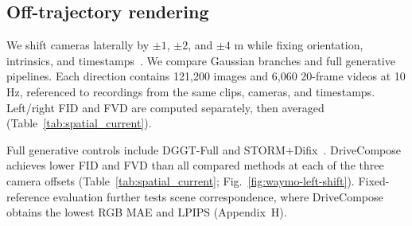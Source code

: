\subsection{Off-trajectory rendering}
\label{sec:spatial_evaluation}
We shift cameras laterally by $\pm1$, $\pm2$, and $\pm4$ m while fixing orientation, intrinsics, and timestamps~\cite{chi2026pointforward,zhu2025worldsplat}. We compare Gaussian branches and full generative pipelines. Each direction contains 121,200 images and 6,060 20-frame videos at 10 Hz, referenced to recordings from the same clips, cameras, and timestamps. Left/right FID and FVD are computed separately, then averaged (Table~\ref{tab:spatial_current}).

Full generative controls include DGGT-Full and STORM+Difix~\cite{wu2025difix3d}. DriveCompose achieves lower FID and FVD than all compared methods at each of the three camera offsets (Table~\ref{tab:spatial_current}; Fig.~\ref{fig:waymo-left-shift}). Fixed-reference evaluation further tests scene correspondence, where DriveCompose obtains the lowest RGB MAE and LPIPS (Appendix~H).

\begin{table}[!htbp]
\centering
\footnotesize
\setlength{\tabcolsep}{2.5pt}
\renewcommand{\arraystretch}{1.08}
\caption{\textbf{Off-trajectory distribution quality.} FID/FVD are computed separately for left and right shifts, then averaged.}
\label{tab:spatial_current}
\end{table}


